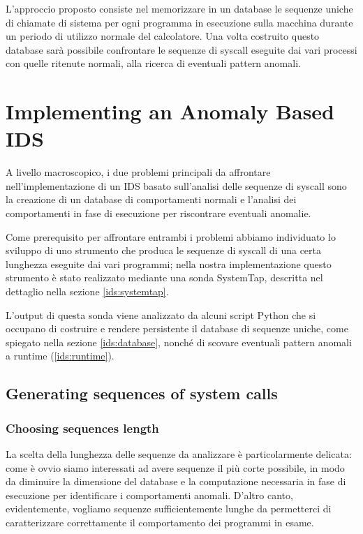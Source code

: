 \documentclass[11pt]{article}
\begin{document}
L'approccio proposto consiste nel memorizzare in un database le sequenze uniche
di chiamate di sistema per ogni programma in esecuzione sulla macchina durante
un periodo di utilizzo normale del calcolatore. Una volta costruito questo
database sarà possibile confrontare le sequenze di syscall eseguite dai vari
processi con quelle ritenute normali, alla ricerca di eventuali pattern
anomali.


\section{Implementing an Anomaly Based IDS}
A livello macroscopico, i due problemi principali da affrontare
nell'implementazione di un IDS basato sull'analisi delle sequenze di syscall
sono la creazione di un database di comportamenti normali e l'analisi dei
comportamenti in fase di esecuzione per riscontrare eventuali anomalie.

Come prerequisito per affrontare entrambi i problemi abbiamo individuato lo
sviluppo di uno strumento che produca le sequenze di syscall di una certa
lunghezza eseguite dai vari programmi; nella nostra implementazione questo
strumento è stato realizzato mediante una sonda SystemTap, descritta nel
dettaglio nella sezione \ref{ids:systemtap}.

L'output di questa sonda viene analizzato da alcuni script Python che si
occupano di costruire e rendere persistente il database di sequenze uniche,
come spiegato nella sezione \ref{ids:database}, nonché di scovare eventuali
pattern anomali a runtime (\ref{ids:runtime}).

\subsection{Generating sequences of system calls}
\subsubsection{Choosing sequences length}
La scelta della lunghezza delle sequenze da analizzare è particolarmente
delicata: come è ovvio siamo interessati ad avere sequenze il più corte
possibile, in modo da diminuire la dimensione del database e la computazione
necessaria in fase di esecuzione per identificare i comportamenti anomali.
D'altro canto, evidentemente, vogliamo sequenze sufficientemente lunghe da
permetterci di caratterizzare correttamente il comportamento dei programmi in
esame.
\end{document}
